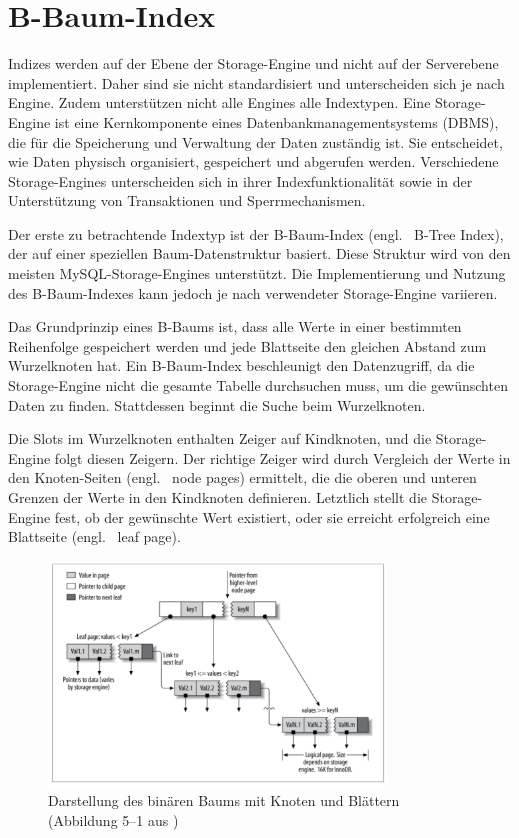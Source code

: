 \section{B-Baum-Index}\label{sec:indexing-b-baum-index}

Indizes werden auf der Ebene der Storage-Engine und nicht auf der Serverebene implementiert.
Daher sind sie nicht standardisiert und unterscheiden sich je nach Engine.
Zudem unterstützen nicht alle Engines alle Indextypen.
Eine Storage-Engine ist eine Kernkomponente eines Datenbankmanagementsystems (DBMS), die für die Speicherung und Verwaltung der Daten zuständig ist.
Sie entscheidet, wie Daten physisch organisiert, gespeichert und abgerufen werden.
Verschiedene Storage-Engines unterscheiden sich in ihrer Indexfunktionalität sowie in der Unterstützung von Transaktionen und Sperrmechanismen.

Der erste zu betrachtende Indextyp ist der B-Baum-Index (engl. \ B-Tree Index), der auf einer speziellen Baum-Datenstruktur basiert.
Diese Struktur wird von den meisten MySQL-Storage-Engines unterstützt.
Die Implementierung und Nutzung des B-Baum-Indexes kann jedoch je nach verwendeter Storage-Engine variieren.

Das Grundprinzip eines B-Baums ist, dass alle Werte in einer bestimmten Reihenfolge gespeichert werden und jede Blattseite den gleichen Abstand zum Wurzelknoten hat.
Ein B-Baum-Index beschleunigt den Datenzugriff, da die Storage-Engine nicht die gesamte Tabelle durchsuchen muss, um die gewünschten Daten zu finden.
Stattdessen beginnt die Suche beim Wurzelknoten.

Die Slots im Wurzelknoten enthalten Zeiger auf Kindknoten, und die Storage-Engine folgt diesen Zeigern.
Der richtige Zeiger wird durch Vergleich der Werte in den Knoten-Seiten (engl. \ node pages) ermittelt, die die oberen und unteren Grenzen der Werte in den Kindknoten definieren.
Letztlich stellt die Storage-Engine fest, ob der gewünschte Wert existiert, oder sie erreicht erfolgreich eine Blattseite (engl. \ leaf page).

\begin{figure}[H]
    \centering
    \includegraphics[width=0.8\textwidth]{PNGs/Textbook/B_Tree_Visualisation}
    \caption[Binärbaum-Visualisierung]{Darstellung des binären Baums mit Knoten und Blättern (Abbildung 5--1 aus \cite[S. 149]{schwartz2012high})}
    \label{fig:b-tree-visualisation}
\end{figure}

